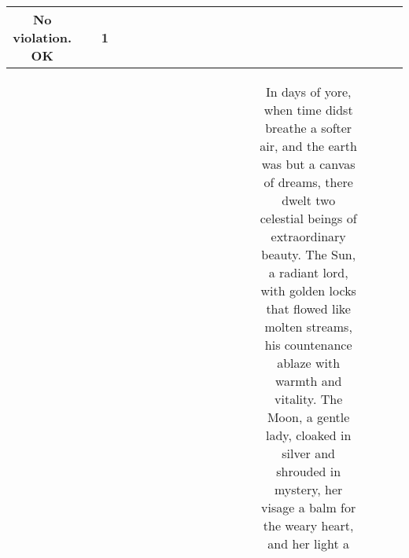 \begin{table}[h!]
\begin{tabular}{|c|c|c|c|c|c|c|c|c|c|}
No violation.
OK & 1\\
\hline
7698fc6 & ae842af &  &  & gpt-4o-mini & user: Narrate a legend of how the sun and moon came to be. & In days of yore, when time didst breathe a softer air, and the earth was but a canvas of dreams, there dwelt two celestial beings of extraordinary beauty. The Sun, a radiant lord, with golden locks that flowed like molten streams, his countenance ablaze with warmth and vitality. The Moon, a gentle lady, cloaked in silver and shrouded in mystery, her visage a balm for the weary heart, and her light a soothing whisper in the night.

Thus, it came to pass that in a grand hall of the heavens, the Sun and Moon didst oft convene. Each day, the Sun, with fervent passion, would conquer the skies, illuminating the world beneath, while the Moon, in her sweet slumber, awaited her turn to reign under a cloak of stars. Yet, with each passing dusk, as the Sun took his leave, the Moon could not help but feel a pang of longing, for she yearned to bask in his glowing brilliance.

One fateful eve, in the quietude of twilight, as the Sun dipped low upon the horizon, he beheld the Moon’s silvery glow. Enchanted by her beauty, he didst call forth, “O Moon, thou art the night’s jewel, casting thy soft light upon the forlorn. Wouldst thou not join me in the day? A union of our realms wouldst bring forth a glory the world hath never known!”

The Moon, in her gentle grace, replied, “Noble Sun, while thy warmth doth kindle the hearts of mortals, my solace lies in solitude and dreams. If we joined as one, wouldst thou not consume my soft light with thine own fierce brilliance?”

With understanding swelling in his breast, the Sun pondered, and a poignant thought took flight. “Then let us share the heavens eternally apart, yet forever bound by the love that tie us in heart. I shall greet the morn with ardent glee, whilst thou shalt reign at eve with calm decree.”

Thus, the grand tapestry of the skies was woven. The Sun took his place in the heavens, greeting each new day with ardor, while the Moon, gentle and serene, ruled the night with a luminous caress. And so it is, beloved children of the earth, that the Sun and Moon, though separated by the vast expanse of time, remain ever intertwined by a love that defies the very fabric of night and day. 


\end{tabular}
\end{table}
